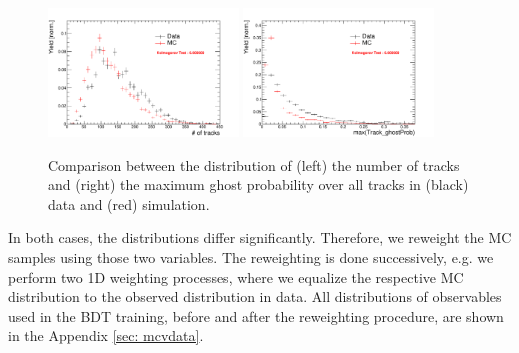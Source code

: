 \begin{figure}[h]
\includegraphics[height=6.cm,width=0.45\textwidth]{figs/nTracks.pdf}
\includegraphics[height=6.cm,width=0.45\textwidth]{figs/max_ghostProb.pdf}
\caption{Comparison between the distribution of (left) the number of tracks and (right) the maximum ghost probability over all tracks in (black) data and (red) simulation.}
\label{fig: MCbeforeWeighting}
\end{figure}


In both cases, the distributions differ significantly. Therefore, we reweight the MC samples using those two variables. 
The reweighting is done successively, e.g. we perform two 1D weighting processes, where we equalize the respective MC distribution to the observed distribution in data.  
All distributions of observables used in the BDT training, before and after the reweighting procedure, are shown in the Appendix \ref{sec: mcvdata}.                 
